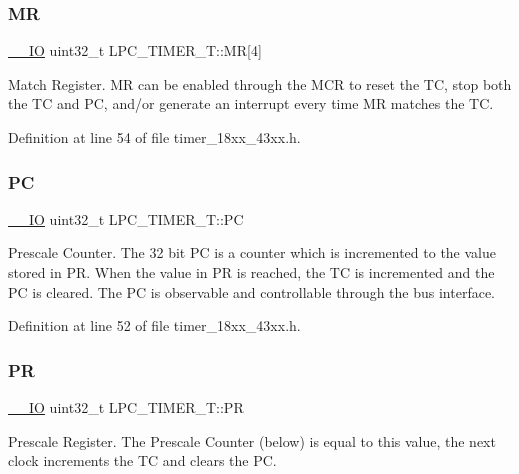 \subsubsection{\texorpdfstring{MR}{MR}}
{\footnotesize\ttfamily \hyperlink{core__sc300_8h_aec43007d9998a0a0e01faede4133d6be}{\+\_\+\+\_\+\+IO} uint32\+\_\+t L\+P\+C\+\_\+\+T\+I\+M\+E\+R\+\_\+\+T\+::\+MR\mbox{[}4\mbox{]}}

Match Register. MR can be enabled through the M\+CR to reset the TC, stop both the TC and PC, and/or generate an interrupt every time MR matches the TC. 

Definition at line 54 of file timer\+\_\+18xx\+\_\+43xx.\+h.

\mbox{\label{struct_l_p_c___t_i_m_e_r___t_aff47df94f3c3f882c742af874983ffb9}} 
\subsubsection{\texorpdfstring{PC}{PC}}
{\footnotesize\ttfamily \hyperlink{core__sc300_8h_aec43007d9998a0a0e01faede4133d6be}{\+\_\+\+\_\+\+IO} uint32\+\_\+t L\+P\+C\+\_\+\+T\+I\+M\+E\+R\+\_\+\+T\+::\+PC}

Prescale Counter. The 32 bit PC is a counter which is incremented to the value stored in PR. When the value in PR is reached, the TC is incremented and the PC is cleared. The PC is observable and controllable through the bus interface. 

Definition at line 52 of file timer\+\_\+18xx\+\_\+43xx.\+h.

\mbox{\label{struct_l_p_c___t_i_m_e_r___t_ab803475dcfb9c751b2b8d02f02cb9d95}} 
\subsubsection{\texorpdfstring{PR}{PR}}
{\footnotesize\ttfamily \hyperlink{core__sc300_8h_aec43007d9998a0a0e01faede4133d6be}{\+\_\+\+\_\+\+IO} uint32\+\_\+t L\+P\+C\+\_\+\+T\+I\+M\+E\+R\+\_\+\+T\+::\+PR}

Prescale Register. The Prescale Counter (below) is equal to this value, the next clock increments the TC and clears the PC. 

